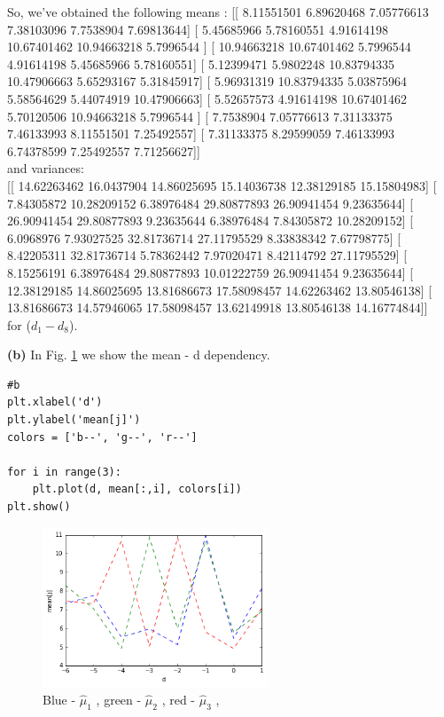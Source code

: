 \documentclass[a4paper, 12pt]{article}
\begin{document}
So, we've obtained the following means : [[  8.11551501   6.89620468   7.05776613   7.38103096   7.7538904
    7.69813644]
 [  5.45685966   5.78160551   4.91614198  10.67401462  10.94663218
    5.7996544 ]
 [ 10.94663218  10.67401462   5.7996544    4.91614198   5.45685966
    5.78160551]
 [  5.12399471   5.9802248   10.83794335  10.47906663   5.65293167
    5.31845917]
 [  5.96931319  10.83794335   5.03875964   5.58564629   5.44074919
   10.47906663]
 [  5.52657573   4.91614198  10.67401462   5.70120506  10.94663218
    5.7996544 ]
 [  7.7538904    7.05776613   7.31133375   7.46133993   8.11551501
    7.25492557]
 [  7.31133375   8.29599059   7.46133993   6.74378599   7.25492557
    7.71256627]]\\

and variances:\\

[[ 14.62263462  16.0437904   14.86025695  15.14036738  12.38129185
   15.15804983]
 [  7.84305872  10.28209152   6.38976484  29.80877893  26.90941454
    9.23635644]
 [ 26.90941454  29.80877893   9.23635644   6.38976484   7.84305872
   10.28209152]
 [  6.0968976    7.93027525  32.81736714  27.11795529   8.33838342
    7.67798775]
 [  8.42205311  32.81736714   5.78362442   7.97020471   8.42114792
   27.11795529]
 [  8.15256191   6.38976484  29.80877893  10.01222759  26.90941454
    9.23635644]
 [ 12.38129185  14.86025695  13.81686673  17.58098457  14.62263462
   13.80546138]
 [ 13.81686673  14.57946065  17.58098457  13.62149918  13.80546138
   14.16774844]]\\
for ($d_1 - d_8$).

\textbf{(b)} In Fig. \ref{fig:mean} we show the mean - d dependency.

\begin{lstlisting}
#b
plt.xlabel('d')
plt.ylabel('mean[j]')
colors = ['b--', 'g--', 'r--']

for i in range(3):
    plt.plot(d, mean[:,i], colors[i])
plt.show()
\end{lstlisting}

\begin{figure}[h]
  \centering
  \caption{Blue - $\hat{\mu}_1$ , green - $\hat{\mu}_2$ , red - $\hat{\mu}_3$ , \label{fig:mean}}
  \includegraphics[width=0.6\textwidth]{mean}
\end{figure}
\end{document}
